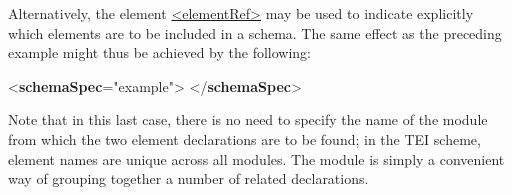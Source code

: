 Alternatively, the element \hyperref[TEI.elementRef]{<elementRef>} may be used to indicate explicitly which elements are to be included in a schema. The same effect as the preceding example might thus be achieved by the following: \par\bgroup{}\exampleFont \begin{shaded}\noindent\mbox{}{<\textbf{schemaSpec}\hspace*{1em}{ident}="{example}">}\mbox{}\newline 
{}\mbox{}\newline 
{}\mbox{}\newline 
{}\mbox{}\newline 
{</\textbf{schemaSpec}>}\end{shaded}\egroup\par \noindent  Note that in this last case, there is no need to specify the name of the module from which the two element declarations are to be found; in the TEI scheme, element names are unique across all modules. The module is simply a convenient way of grouping together a number of related declarations.\par

